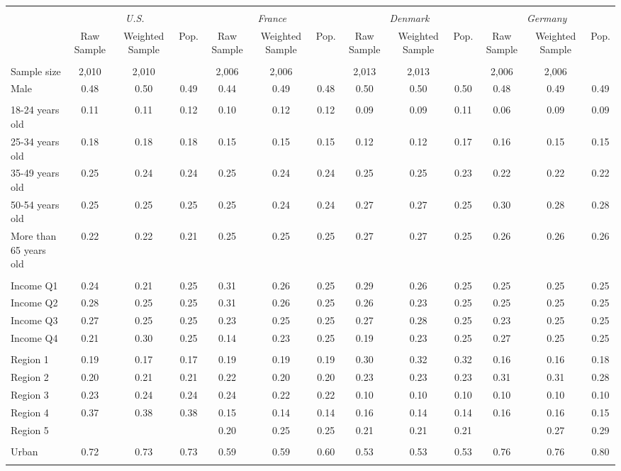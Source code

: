 \begin{tabular}{l*{12}{c}}
\toprule
\hline \\[-1.8ex]
\multicolumn{1}{c}{\em{ }} & \multicolumn{3}{c}{\em{U.S.}} & \multicolumn{3}{c}{\em{France}} & \multicolumn{3}{c}{\em{Denmark}} & \multicolumn{3}{c}{\em{Germany}}\\
\cmidrule(l{3pt}r{3pt}){2-4} \cmidrule(l{3pt}r{3pt}){5-7} \cmidrule(l{3pt}r{3pt}){8-10} \cmidrule(l{3pt}r{3pt}){11-13}
\noalign{\smallskip}  & Raw Sample & Weighted Sample & Pop. & Raw Sample & Weighted Sample & Pop. & Raw Sample & Weighted Sample & Pop. & Raw Sample & Weighted Sample & Pop. \\
\hline \\[-1.8ex] 
Sample size & 2,010 & 2,010 & & 2,006 & 2,006 &  & 2,013 & 2,013 & & 2,006 & 2,006 & \\
\noalign{\smallskip}\hline \noalign{\smallskip}Male & 0.48 & 0.50 & 0.49 & 0.44 & 0.49 & 0.48 & 0.50 & 0.50 & 0.50 & 0.48 & 0.49 & 0.49 \\ 
\\
18-24 years old & 0.11 & 0.11 & 0.12 & 0.10 & 0.12 & 0.12 & 0.09 & 0.09 & 0.11 & 0.06 & 0.09 & 0.09 \\
25-34 years old & 0.18 & 0.18 & 0.18 & 0.15 & 0.15 & 0.15 & 0.12 & 0.12 & 0.17 & 0.16 & 0.15 & 0.15 \\
35-49 years old & 0.25 & 0.24 & 0.24 & 0.25 & 0.24 & 0.24 & 0.25 & 0.25 & 0.23 & 0.22 & 0.22 & 0.22 \\
50-54 years old & 0.25 & 0.25 & 0.25 & 0.25 & 0.24 & 0.24 & 0.27 & 0.27 & 0.25 & 0.30 & 0.28 & 0.28 \\
More than 65 years old & 0.22 & 0.22 & 0.21 & 0.25 & 0.25 & 0.25 & 0.27 & 0.27 & 0.25 & 0.26 & 0.26 & 0.26 \\ 
\\
Income Q1 & 0.24 & 0.21 & 0.25 & 0.31 & 0.26 & 0.25 & 0.29 & 0.26 & 0.25 & 0.25 & 0.25 & 0.25 \\
Income Q2 & 0.28 & 0.25 & 0.25 & 0.31 & 0.26 & 0.25 & 0.26 & 0.23 & 0.25 & 0.25 & 0.25 & 0.25 \\
Income Q3 & 0.27 & 0.25 & 0.25 & 0.23 & 0.25 & 0.25 & 0.27 & 0.28 & 0.25 & 0.23 & 0.25 & 0.25 \\
Income Q4 & 0.21 & 0.30 & 0.25 & 0.14 & 0.23 & 0.25 & 0.19 & 0.23 & 0.25 & 0.27 & 0.25 & 0.25 \\
\\
Region 1 & 0.19 & 0.17 & 0.17 & 0.19 & 0.19 & 0.19 & 0.30 & 0.32 & 0.32 & 0.16 & 0.16 & 0.18 \\
Region 2 & 0.20 & 0.21 & 0.21 & 0.22 & 0.20 & 0.20 & 0.23 & 0.23 & 0.23 & 0.31 & 0.31 & 0.28 \\
Region 3 & 0.23 & 0.24 & 0.24 & 0.24 & 0.22 & 0.22 & 0.10 & 0.10 & 0.10 & 0.10 & 0.10 & 0.10 \\
Region 4 & 0.37 & 0.38 & 0.38 & 0.15 & 0.14 & 0.14 & 0.16 & 0.14 & 0.14 & 0.16 & 0.16 & 0.15 \\
Region 5 & &  &  & 0.20 & 0.25 & 0.25 & 0.21 & 0.21 & 0.21 & & 0.27 & 0.29 \\
\\
Urban & 0.72 & 0.73 & 0.73 & 0.59 & 0.59 & 0.60 & 0.53 & 0.53 & 0.53 & 0.76 & 0.76 & 0.80 \\
\\
\bottomrule
\end{tabular}